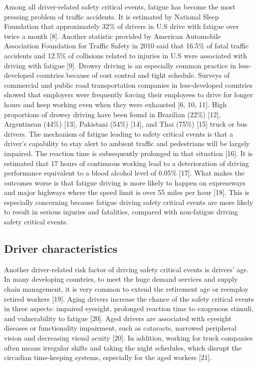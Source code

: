 \documentclass[12pt]{book}
\numberwithin{equation}{chapter}
\begin{document}
Among all driver-related safety critical events, fatigue has become the most pressing problem of traffic accidents. It is estimated by National Sleep Foundation that approximately 32\% of drivers in U.S drive with fatigue over twice a month {[}8{]}. Another statistic provided by American Automobile Association Foundation for Traffic Safety in 2010 said that 16.5\% of fatal traffic accidents and 12.5\% of collisions related to injuries in U.S were associated with driving with fatigue {[}9{]}. Drowsy driving is an especially common practice in less-developed countries because of cost control and tight schedule. Surveys of commercial and public road transportation companies in less-developed countries showed that employers were frequently forcing their employees to drive for longer hours and keep working even when they were exhausted {[}6, 10, 11{]}. High proportions of drowsy driving have been found in Brazilian (22\%) {[}12{]}, Argentinean (44\%) {[}13{]}, Pakistani (54\%) {[}14{]}, and Thai (75\%) {[}15{]} truck or bus drivers. The mechanism of fatigue leading to safety critical events is that a driver's capability to stay alert to ambient traffic and pedestrians will be largely impaired. The reaction time is subsequently prolonged in that situation {[}16{]}. It is estimated that 17 hours of continuous working lead to a deterioration of driving performance equivalent to a blood alcohol level of 0.05\% {[}17{]}. What makes the outcomes worse is that fatigue driving is more likely to happen on expressways and major highways where the speed limit is over 55 miles per hour {[}18{]}. This is especially concerning because fatigue driving safety critical events are more likely to result in serious injuries and fatalities, compared with non-fatigue driving safety critical events.

\hypertarget{driver-characteristics}{%
\subsection{Driver characteristics}\label{driver-characteristics}}

Another driver-related risk factor of driving safety critical events is drivers' age. In many developing countries, to meet the huge demand services and supply chain management, it is very common to extend the retirement age or reemploy retired workers {[}19{]}. Aging drivers increase the chance of the safety critical events in three aspects: impaired eyesight, prolonged reaction time to exogenous stimuli, and vulnerability to fatigue {[}20{]}. Aged drivers are associated with eyesight diseases or functionality impairment, such as cataracts, narrowed peripheral vision and decreasing visual acuity {[}20{]}. In addition, working for truck companies often means irregular shifts and taking the night schedules, which disrupt the circadian time-keeping systems, especially for the aged workers {[}21{]}.
\end{document}
